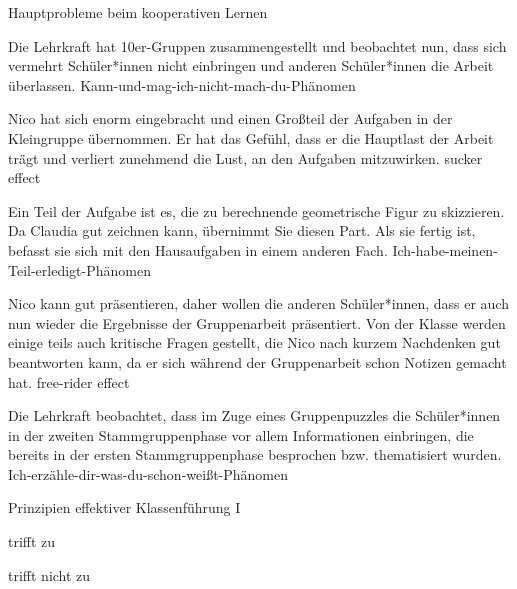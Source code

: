 \begin{mapping}{Hauptprobleme beim kooperativen Lernen}
    \begin{answer}
        Die Lehrkraft hat 10er-Gruppen zusammengestellt und beobachtet nun, dass sich vermehrt Schüler*innen nicht einbringen und anderen Schüler*innen die Arbeit überlassen.
        \ismappedto
        Kann-und-mag-ich-nicht-mach-du-Phänomen
    \end{answer}
    \begin{answer}
        Nico hat sich enorm eingebracht und einen Großteil der Aufgaben in der Kleingruppe übernommen. Er hat das Gefühl, dass er die Hauptlast der Arbeit trägt und verliert zunehmend die Lust, an den Aufgaben mitzuwirken.
        \ismappedto
        sucker effect
    \end{answer}
    \begin{answer}
        Ein Teil der Aufgabe ist es, die zu berechnende geometrische Figur zu skizzieren. Da Claudia gut zeichnen kann, übernimmt Sie diesen Part. Als sie fertig ist, befasst sie sich mit den Hausaufgaben in einem anderen Fach.
        \ismappedto
        Ich-habe-meinen-Teil-erledigt-Phänomen
    \end{answer}
    \begin{answer}
        Nico kann gut präsentieren, daher wollen die anderen Schüler*innen, dass er auch nun wieder die Ergebnisse der Gruppenarbeit präsentiert. Von der Klasse werden einige teils auch kritische Fragen gestellt, die Nico nach kurzem Nachdenken gut beantworten kann, da er sich während der Gruppenarbeit schon Notizen gemacht hat.
        \ismappedto
        free-rider effect
    \end{answer}
    \begin{answer}
        Die Lehrkraft beobachtet, dass im Zuge eines Gruppenpuzzles die Schüler*innen in der zweiten Stammgruppenphase vor allem Informationen einbringen, die bereits in der ersten Stammgruppenphase besprochen bzw. thematisiert wurden.
        \ismappedto
        Ich-erzähle-dir-was-du-schon-weißt-Phänomen
    \end{answer}
\end{mapping}

\begin{single-choice}{Prinzipien effektiver Klassenführung I}
    \begin{answers}
        \item[\correct] trifft zu
        \item[\wrong] trifft nicht zu
    \end{answers}
\end{single-choice}

